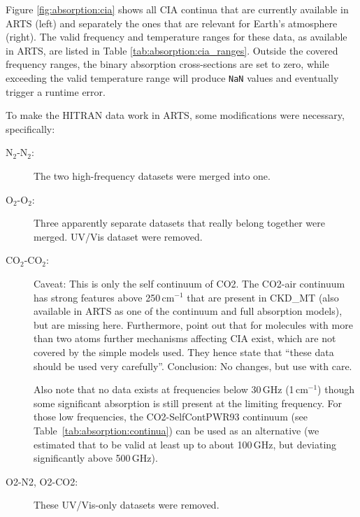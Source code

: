 Figure \ref{fig:absorption:cia} shows all CIA continua that are
currently available in ARTS (left) and separately the ones that are
relevant for Earth's atmosphere (right). The valid frequency and
temperature ranges for these data, as available in ARTS, are listed in
Table \ref{tab:absorption:cia_ranges}. Outside the covered frequency ranges, the
binary absorption cross-sections are set to zero, while exceeding the valid
temperature range will produce \verb|NaN| values and eventually trigger a
runtime error.

To make the HITRAN data work in ARTS, some modifications were necessary,
specifically:

\begin{description}
\item[N$_2$-N$_2$:] The two high-frequency datasets were merged into one.
\item[O$_2$-O$_2$:] Three apparently separate datasets that really
  belong together were merged. UV/Vis dataset were removed.
\item[CO$_2$-CO$_2$:] Caveat: This is only the self continuum of
  CO2. The CO2-air continuum has strong features above 250\,cm$^{-1}$ that
  are present in CKD\_MT (also available in ARTS as one of the
  continuum and full absorption models), but are missing here.
  Furthermore, \citet{richard:12} point out that for molecules with more than two atoms
  further mechanisms affecting CIA exist, which are not covered by the simple
  models used. They hence state that ``these data should be used very
  carefully''. Conclusion: No changes, but use with care.

  Also note that no data exists at frequencies below 30\,GHz (1\,cm$^{-1}$)
  though some significant absorption is still present at the limiting frequency.
  For those low frequencies, the CO2-SelfContPWR93 continuum (see
  Table~\ref{tab:absorption:continua}) can be used as an alternative (we
  estimated that to be valid at least up to about 100\,GHz, but deviating
  significantly above 500\,GHz).
\item[O2-N2, O2-CO2:] These UV/Vis-only datasets were removed.


\end{description}
